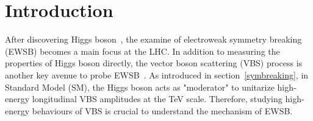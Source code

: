 \section{Introduction}

After discovering Higgs boson~\cite{20121, 201230}, the examine of electroweak symmetry breaking (EWSB) becomes a main focus at the LHC.
In addition to measuring the properties of Higgs boson directly, the vector boson scattering (VBS) process is another key avenue to probe EWSB~\cite{Lee:1977yc, Chanowitz:1985hj, Szleper:2014xxa}.
As introduced in section~\ref{symbreaking}, in Standard Model (SM), the Higgs boson acts as "moderator" to unitarize high-energy longitudinal VBS amplitudes at the TeV scale.
Therefore, studying high-energy behaviours of VBS is crucial to understand the mechanism of EWSB.

